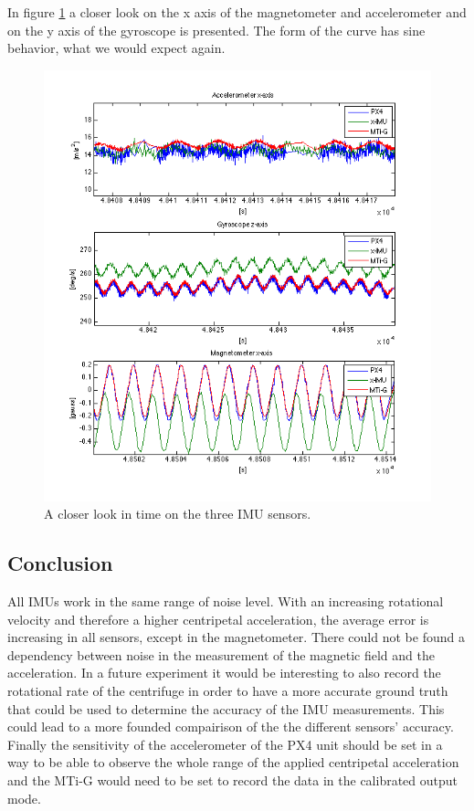In figure \ref{ct_sine} a closer look on the x axis of the magnetometer and accelerometer and on the y axis of the gyroscope is presented. The form of the curve has sine behavior, what we would expect again.
\begin{figure}[hb]
\includegraphics[width=1\textwidth]{pictures/ct_sine.png}
\caption{A closer look in time on the three IMU sensors.}
\label{ct_sine}
\end{figure}

\subsection{Conclusion}
All IMUs work in the same range of noise level. With an increasing rotational velocity and therefore a higher centripetal acceleration, the average error is increasing in all sensors, except in the magnetometer. There could not be found a dependency between noise in the measurement of the magnetic field and the acceleration. 
In a future experiment it would be interesting to also record the rotational rate of the centrifuge in order to have a more accurate ground truth that could be used to determine the accuracy of the IMU measurements. This could lead to a more founded compairison of the the different sensors' accuracy. Finally the sensitivity of the accelerometer of the PX4 unit should be set in a way to be able to observe the whole range of the applied centripetal acceleration and the MTi-G would need to be set to record the data in the calibrated output mode.

